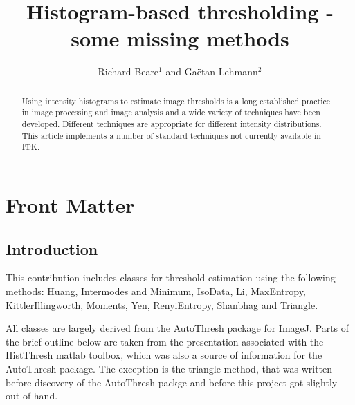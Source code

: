 \documentclass{InsightArticle}
\title{Histogram-based thresholding - some missing methods}
\author{Richard Beare{$^1$} {\small{and}} Ga\"etan Lehmann{$^2$}}
\newcommand{\IJhandlerIDnumber}{}
\begin{document}
%
% 
\IJhandlefooter{\IJhandlerIDnumber}{3279}

\maketitle

\ifhtml
\chapter*{Front Matter\label{front}}
\fi


\begin{abstract}
\noindent
Using intensity histograms to estimate image thresholds is a long
established practice in image processing and image analysis and a wide
variety of techniques have been developed. Different techniques are
appropriate for different intensity distributions. This article
implements a number of standard techniques not currently available in
ITK.
\end{abstract}

\IJhandlenote{\IJhandlerIDnumber}

\tableofcontents

\section{Introduction}
This contribution includes classes for threshold estimation using the
following methods: Huang\cite{huang1995image},
Intermodes and Minimum\cite{prewitt1965analysis}, IsoData\cite{ridler1978picture},
Li\cite{li1993minimum,li1998iterative}, MaxEntropy\cite{kapur1985new},
KittlerIllingworth\cite{kittler1986minimum},
Moments\cite{tsai1985moment}, Yen\cite{yen1995new},
RenyiEntropy\cite{kapur1985new},
Shanbhag\cite{shanbhag1994utilization} and
Triangle\cite{zack1977automatic}.

All classes are largely derived from the AutoThresh
\cite{LandiniImageJ} package for ImageJ. Parts of the brief outline below are
taken from the presentation associated with the
HistThresh\cite{HistThreshMatlab} matlab toolbox, which was also a
source of information for the AutoThresh package. The exception is the
triangle method, that was written before discovery of the AutoThresh
packge and before this project got slightly out of hand.
\end{document}

